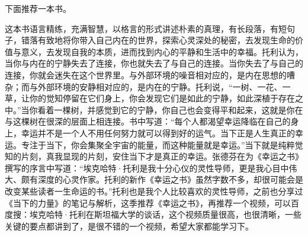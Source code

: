 下面推荐一本书。

\begin{book}
    这本书语言精练，充满智慧，以格言的形式讲述朴素的真理，有长段落，有短句子，错落有致地将你带入自己内在的世界，探索心灵深处的秘密，去发现生命的价值与意义，去发现自我的本质，进而找到内心的平静和生活中的幸福。托利认为，当你与内在的宁静失去了连接，你也就失去了与自己的连接。当你失去了与自己的连接，你就会迷失在这个世界里。与外部环境的噪音相对应的，是内在思想的嘈杂；而与外部环境的安静相对应的，是内在的宁静。托利说，“一树、一花、一草，让你的觉知停留在它们身上，你会发现它们是如此的宁静，如此深植于存在之中。”当你看着一棵树，并感觉到它的宁静，你自己也会变得平和起来，这就是你在与这棵树在很深的层面上相连接。书中写道：“每个人都渴望幸运降临在自己的身上，幸运并不是一个人不用任何努力就可以得到好的运气。当下正是人生真正的幸运。专注于当下，你会集聚全宇宙的能量，而这种能量就是幸运。”当下就是纯粹觉知的片刻，真我显现的片刻，安住当下才是真正的幸运。张德芬在为《幸运之书》撰写的序言中写道：“埃克哈特·托利是我十分心仪的灵性导师，更是我心目中伟大、颇有深度的心灵作家。托利的新作《幸运之书》虽然字数不多，却很可能会是改变某些读者一生命运的书。”托利也是我个人比较喜欢的灵性导师，之前也分享过《当下的力量》的笔记与解析，这季推荐《幸运之书》，再推荐一个视频，可以百度搜：埃克哈特·托利在斯坦福大学的谈话，这个视频质量很高，也很清晰，一些关键的要点都讲到了，是很不错的一个视频，希望大家都能学习下。
\end{book}
